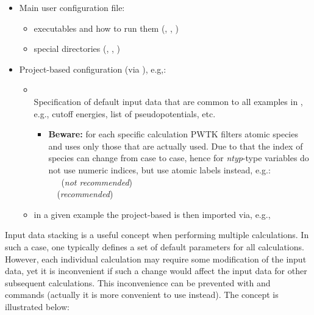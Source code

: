 \documentclass[landscape]{foils}
\begin{document}
\begin{itemize}
\item Main user configuration file: 
  \begin{itemize}
  \item executables and how to run them (, ,
    )
  \item special directories (, , )
  \end{itemize}
\item Project-based configuration (via ), e.g,:  
  \begin{itemize}
  \item {}\\[0.3em]
    Specification of default input data that are common to all examples in
    , e.g., cutoff energies, list of
    pseudopotentials, etc.
    \vspace{0.5em}
    {\small
      \begin{itemize}
      \item {\bf Beware:} for each specific calculation PWTK filters atomic
        species and uses only those that are actually used. Due to that
        the index of species can change from case to case, hence for
        {\em ntyp}-type variables do not use numeric indices, but use
        atomic labels instead, e.g.:\\
         ~~~({\red\em not recommended})\\
         ~~({\green\em recommended})
      \end{itemize}
    }
    \vspace{0.5em}
  \item in a given example the project-based  is
    then imported via, e.g.,
  \end{itemize}
\end{itemize}

\rightheader{}

{\small Input data stacking is a useful concept when performing
  multiple calculations. In such a case, one typically defines a set
  of default parameters for all calculations. However, each individual
  calculation may require some modification of the input data, yet it
  is inconvenient if such a change would affect the input data for
  other subsequent calculations.
  This inconvenience can be prevented with  and 
  commands (actually it is more convenient to use  instead). The concept is illustrated below:}
\end{document}

